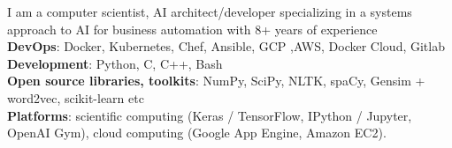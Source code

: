 
\begin{cvparagraph}
I am a computer scientist, AI architect/developer specializing in a systems approach to AI for business automation with 8+ years of experience\\
\textbf{DevOps}:  Docker, Kubernetes, Chef, Ansible, GCP ,AWS, Docker Cloud, Gitlab\\
\textbf{Development}:  Python, C, C++, Bash\\
\textbf{Open source libraries, toolkits}: NumPy, SciPy, NLTK, spaCy, Gensim + word2vec, scikit-learn etc\\
\textbf{Platforms}: scientific computing (Keras / TensorFlow, IPython / Jupyter, OpenAI Gym), cloud computing (Google App Engine, Amazon EC2).
\end{cvparagraph}



